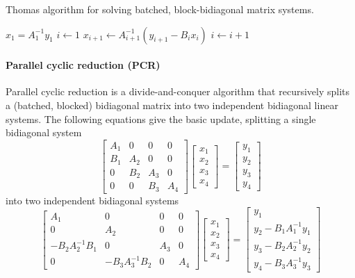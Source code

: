\begin{algorithm}
\caption{Thomas algorithm for solving batched, block-bidiagonal matrix systems.}\label{alg:thomas}
\begin{algorithmic}
\State $x_1 = A_{1}^{-1} y_1$
\State $i \gets 1$
\State $x_{i+1} \gets A_{i+1}^{-1} \left(y_{i+1} - B_{i} x_{i} \right)$
\State $i \gets i + 1$
\EndWhile
\end{algorithmic}
\end{algorithm}

\paragraph{Parallel cyclic reduction (PCR)}
Parallel cyclic reduction is a divide-and-conquer algorithm that recursively splits a (batched, blocked) bidiagonal matrix into two independent bidiagonal linear systems.  The following equations give the basic update, splitting a single bidiagonal system 
\begin{equation}
\begin{bmatrix}
A_1 & 0 & 0 & 0\\ 
B_1 & A_2 & 0 & 0\\ 
0 & B_2 & A_3 & 0\\ 
0 & 0 & B_3 & A_4
\end{bmatrix} \begin{bmatrix}
x_1\\ 
x_2\\ 
x_3\\ 
x_4
\end{bmatrix} = \begin{bmatrix}
y_1\\ 
y_2\\ 
y_3\\ 
y_4
\end{bmatrix}
\end{equation}
into two independent bidiagonal systems
\begin{equation}
\begin{bmatrix}
A_1 & 0 & 0 & 0\\ 
0 & A_2 & 0 & 0\\ 
-B_2 A_2^{-1} B_1 & 0 & A_3 & 0\\ 
0 & -B_3 A_3^{-1} B_2 & 0 & A_4
\end{bmatrix} \begin{bmatrix}
x_1\\ 
x_2\\ 
x_3\\ 
x_4
\end{bmatrix} = \begin{bmatrix}
y_1\\ 
y_2 - B_1 A_1^{-1} y_1\\ 
y_3 - B_2 A_2^{-1} y_2\\ 
y_4 - B_3 A_3^{-1} y_3
\end{bmatrix}
\end{equation}
